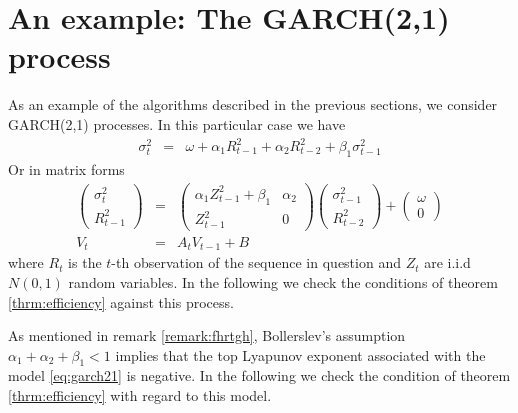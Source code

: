 \section{An example: The GARCH(2,1) process}
As an example of the algorithms described in the previous sections, we
consider GARCH(2,1) processes. In this particular case we have
\begin{eqnarray*}
  \sigma_t^2 &=& \omega + \alpha_1 R_{t-1}^2 + \alpha_2 R_{t-2}^2 +
  \beta_1 \sigma_{t-1}^2
\end{eqnarray*}
Or in matrix forms
\begin{eqnarray}
  \begin{pmatrix}
    \sigma_t^2 \\
    R_{t-1}^2
  \end{pmatrix}
  &=&
  \begin{pmatrix}
  \alpha_1 Z_{t-1}^2 + \beta_1 & \alpha_2 \\
  Z_{t-1}^2 & 0
  \end{pmatrix}
  \begin{pmatrix}
    \sigma_{t-1}^2 \\
    R_{t-2}^2
  \end{pmatrix}
  +
  \begin{pmatrix}
    \omega \\
    0
  \end{pmatrix}
  \label{eq:garch21} \\
  V_t &=& A_t V_{t-1} + B \nonumber
\end{eqnarray}
where $R_t$ is the $t$-th observation of the sequence in question and
$Z_t$ are i.i.d $N(0,1)$ random variables. In the following we check
the conditions of theorem \ref{thrm:efficiency} against this process. 

As mentioned in remark \ref{remark:fhrtgh}, Bollerslev's assumption
$\alpha_1 + \alpha_2 + \beta_1 < 1$ implies that the top Lyapunov
exponent associated with the model \eqref{eq:garch21} is
negative. In the following we check the condition of theorem
\ref{thrm:efficiency} with regard to this model.

